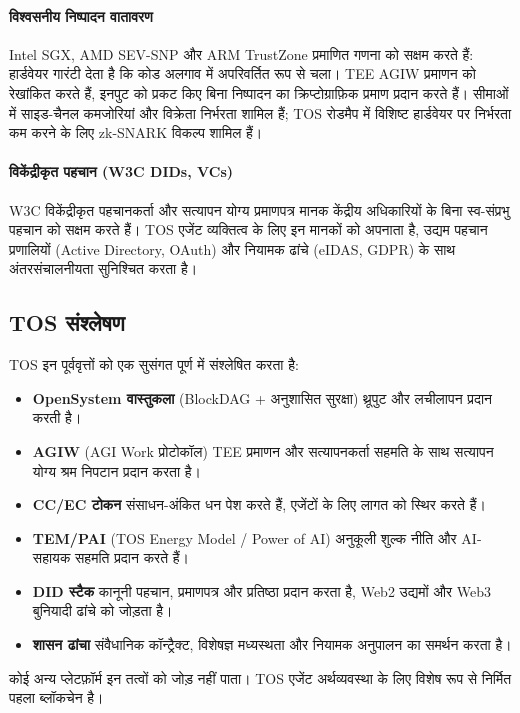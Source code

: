 \documentclass[11pt]{article}
\begin{document}
\paragraph{विश्वसनीय निष्पादन वातावरण} Intel SGX, AMD SEV-SNP और ARM TrustZone प्रमाणित गणना को सक्षम करते हैं: हार्डवेयर गारंटी देता है कि कोड अलगाव में अपरिवर्तित रूप से चला। TEE AGIW प्रमाणन को रेखांकित करते हैं, इनपुट को प्रकट किए बिना निष्पादन का क्रिप्टोग्राफ़िक प्रमाण प्रदान करते हैं। सीमाओं में साइड-चैनल कमजोरियां और विक्रेता निर्भरता शामिल हैं; TOS रोडमैप में विशिष्ट हार्डवेयर पर निर्भरता कम करने के लिए zk-SNARK विकल्प शामिल हैं।

\paragraph{विकेंद्रीकृत पहचान (W3C DIDs, VCs)} W3C विकेंद्रीकृत पहचानकर्ता और सत्यापन योग्य प्रमाणपत्र मानक केंद्रीय अधिकारियों के बिना स्व-संप्रभु पहचान को सक्षम करते हैं। TOS एजेंट व्यक्तित्व के लिए इन मानकों को अपनाता है, उद्यम पहचान प्रणालियों (Active Directory, OAuth) और नियामक ढांचे (eIDAS, GDPR) के साथ अंतरसंचालनीयता सुनिश्चित करता है।

\subsection{TOS संश्लेषण}
TOS इन पूर्ववृत्तों को एक सुसंगत पूर्ण में संश्लेषित करता है:
\begin{itemize}[noitemsep]
  \item \textbf{OpenSystem वास्तुकला} (BlockDAG + अनुशासित सुरक्षा) थ्रूपुट और लचीलापन प्रदान करती है।
  \item \textbf{AGIW} (AGI Work प्रोटोकॉल) TEE प्रमाणन और सत्यापनकर्ता सहमति के साथ सत्यापन योग्य श्रम निपटान प्रदान करता है।
  \item \textbf{CC/EC टोकन} संसाधन-अंकित धन पेश करते हैं, एजेंटों के लिए लागत को स्थिर करते हैं।
  \item \textbf{TEM/PAI} (TOS Energy Model / Power of AI) अनुकूली शुल्क नीति और AI-सहायक सहमति प्रदान करते हैं।
  \item \textbf{DID स्टैक} कानूनी पहचान, प्रमाणपत्र और प्रतिष्ठा प्रदान करता है, Web2 उद्यमों और Web3 बुनियादी ढांचे को जोड़ता है।
  \item \textbf{शासन ढांचा} संवैधानिक कॉन्ट्रैक्ट, विशेषज्ञ मध्यस्थता और नियामक अनुपालन का समर्थन करता है।
\end{itemize}

कोई अन्य प्लेटफ़ॉर्म इन तत्वों को जोड़ नहीं पाता। TOS एजेंट अर्थव्यवस्था के लिए विशेष रूप से निर्मित पहला ब्लॉकचेन है।
\end{document}
